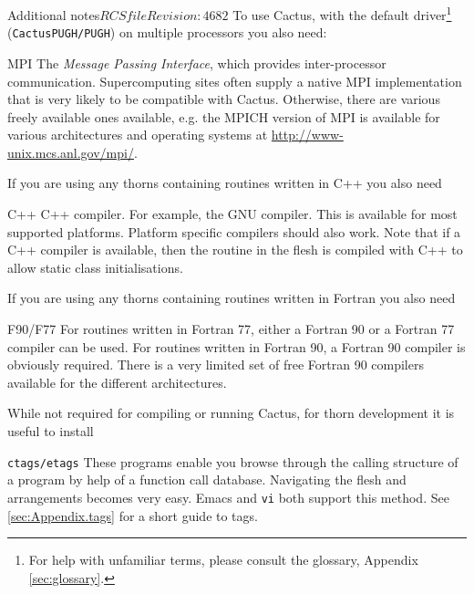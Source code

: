 \begin{cactuspart}{Additional notes}{$RCSfile$}{$Revision: 4682 $}
\noindent
To use Cactus, with the default driver\footnote{For help with unfamiliar terms, please consult the glossary, Appendix \ref{sec:glossary}.} (\texttt{CactusPUGH/PUGH}) on multiple
processors you also need:
\begin{Lentry}
\item[MPI] The \textit{Message Passing Interface},
which provides inter-processor communication.
Supercomputing sites often supply a native MPI implementation
that is very likely to be compatible with Cactus. Otherwise, there are
various freely available ones available, e.g. the MPICH
version of MPI is available for various architectures and operating
systems at \url{http://www-unix.mcs.anl.gov/mpi/}.
\end{Lentry}

\noindent
If you are using any thorns containing routines
written in C++ you also need
\begin{Lentry}
\item[C++] C++ compiler. For example, the GNU compiler. This
 is available for most supported platforms.  Platform specific compilers
 should also work.  Note that if a C++ compiler is available, then the
  routine in the flesh is compiled with C++ to allow static
 class initialisations.
\end{Lentry}

\noindent
If you are using any thorns containing routines
written in Fortran you also need
\begin{Lentry}
\item[F90/F77] For routines written in Fortran 77, either a Fortran 90 or
 a Fortran 77 compiler can be used. For routines written in Fortran 90,
 a Fortran 90 compiler is obviously required. There is a very limited set of
 free Fortran 90 compilers available for the different architectures.
\end{Lentry}

\noindent
While not required for compiling or running Cactus, for thorn development
it is useful to install
\begin{Lentry}
\item[\texttt{ctags/etags}] These programs enable you browse through the
  calling structure of a program by help of a function call database.
  Navigating the flesh and arrangements becomes very easy. Emacs and
  \texttt{vi} both support this method. See \ref{sec:Appendix.tags} for a short
  guide to tags.
\end{Lentry}



\end{cactuspart}
